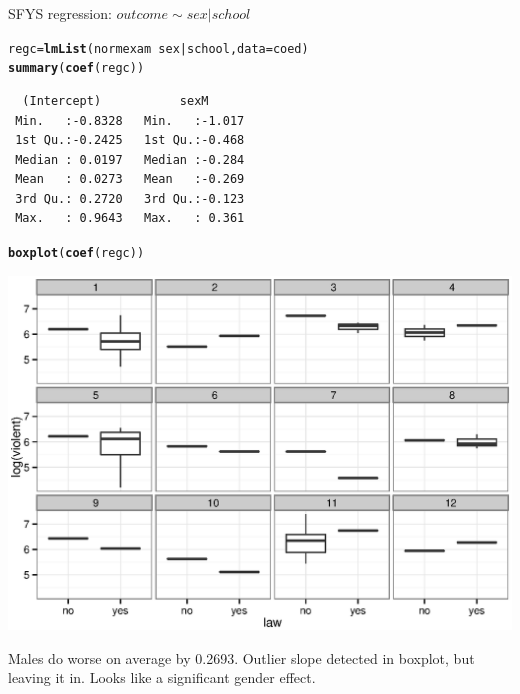 \documentclass{article}\usepackage{graphicx, color}
\makeatletter
\newcommand{\hlfunctioncall}[1]{\textcolor[rgb]{0.501960784313725,0,0.329411764705882}{\textbf{#1}}}%
\newenvironment{kframe}{%
 \def\at@end@of@kframe{}%
 \ifinner\ifhmode%
  \def\at@end@of@kframe{\end{minipage}}%
  \begin{minipage}{\columnwidth}%
 \fi\fi%
 \def\FrameCommand##1{\hskip\@totalleftmargin \hskip-\fboxsep
 \colorbox{shadecolor}{##1}\hskip-\fboxsep
     \hskip-\linewidth \hskip-\@totalleftmargin \hskip\columnwidth}%
 \MakeFramed {\advance\hsize-\width
   \@totalleftmargin\z@ \linewidth\hsize
   \@setminipage}}%
 {\par\unskip\endMakeFramed%
 \at@end@of@kframe}
\newenvironment{knitrout}{}{} %
\makeatother
\begin{document}
SFYS regression: $outcome \sim sex | school$
\begin{knitrout}
\color{fgcolor}\begin{kframe}
\begin{alltt}
regc=\hlfunctioncall{lmList}(normexam~sex|school, data=coed)
\hlfunctioncall{summary}(\hlfunctioncall{coef}(regc)) 
\end{alltt}
\begin{verbatim}
  (Intercept)           sexM       
 Min.   :-0.8328   Min.   :-1.017  
 1st Qu.:-0.2425   1st Qu.:-0.468  
 Median : 0.0197   Median :-0.284  
 Mean   : 0.0273   Mean   :-0.269  
 3rd Qu.: 0.2720   3rd Qu.:-0.123  
 Max.   : 0.9643   Max.   : 0.361  
\end{verbatim}
\begin{alltt}
\hlfunctioncall{boxplot}(\hlfunctioncall{coef}(regc)) 
\end{alltt}
\end{kframe}

{\centering \includegraphics[width=\linewidth]{plots/unnamed-chunk-22} 

}



\end{knitrout}

Males do worse on average by 0.2693. Outlier slope detected in boxplot, but leaving it in. Looks like a significant gender effect.\\
\end{document}
